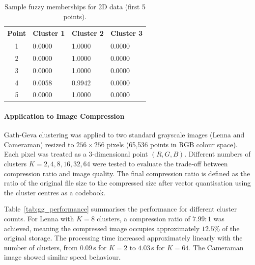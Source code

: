 \begin{table}[H]
\centering
\caption{Sample fuzzy memberships for 2D data (first 5 points).}
\label{tab:gg_memberships}
\begin{tabularx}{\textwidth}{|c|X|X|X|}
\hline
\textbf{Point} & \textbf{Cluster 1} & \textbf{Cluster 2} & \textbf{Cluster 3} \\
\hline
1 & 0.0000 & 1.0000 & 0.0000 \\
2 & 0.0000 & 1.0000 & 0.0000 \\
3 & 0.0000 & 1.0000 & 0.0000 \\
4 & 0.0058 & 0.9942 & 0.0000 \\
5 & 0.0000 & 1.0000 & 0.0000 \\
\hline
\end{tabularx}
\end{table}

\paragraph{Application to Image Compression}
Gath‑Geva clustering was applied to two standard grayscale images (Lenna and Cameraman) resized to $256\times256$ pixels (65,536 points in RGB colour space). Each pixel was treated as a 3‑dimensional point $(R,G,B)$. Different numbers of clusters $K = 2, 4, 8, 16, 32, 64$ were tested to evaluate the trade‑off between compression ratio and image quality. The final compression ratio is defined as the ratio of the original file size to the compressed size after vector quantisation using the cluster centres as a codebook. \cite{Khaleel2014}

Table~\ref{tab:gg_performance} summarises the performance for different cluster counts. For Lenna with $K = 8$ clusters, a compression ratio of $7.99:1$ was achieved, meaning the compressed image occupies approximately $12.5\%$ of the original storage. The processing time increased approximately linearly with the number of clusters, from $0.09$ s for $K=2$ to $4.03$ s for $K=64$. The Cameraman image showed similar speed behaviour.


